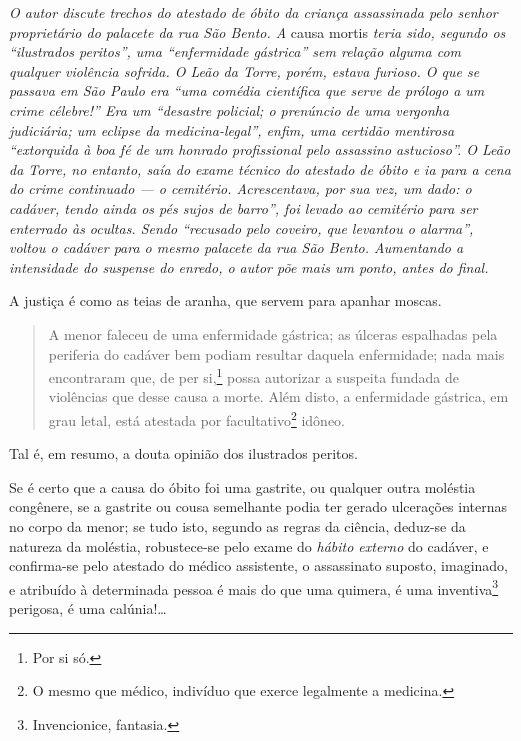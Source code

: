 {\begin{resumo}
\emph{O autor discute trechos do atestado de óbito da criança
assassinada pelo senhor proprietário do palacete da rua São Bento. A}
causa mortis \emph{teria sido, segundo os ``ilustrados peritos'', uma
``enfermidade gástrica'' sem relação alguma com qualquer violência
sofrida. O Leão da Torre, porém, estava furioso. O que se passava
em São Paulo era ``uma comédia científica que serve de prólogo a um crime
célebre!'' Era um ``desastre policial; o prenúncio de uma vergonha
judiciária; um eclipse da medicina-legal'', enfim, uma certidão mentirosa
``extorquida à boa fé de um honrado profissional pelo assassino
astucioso''. O Leão da Torre, no entanto, saía do exame técnico do
atestado de óbito e ia para a cena do crime continuado --- o cemitério.
Acrescentava, por sua vez, um dado: o cadáver, tendo ainda os pés sujos
de barro'', foi levado ao cemitério para ser enterrado às ocultas. Sendo
``recusado pelo coveiro, que levantou o alarma'', voltou o cadáver para o
mesmo palacete da rua São Bento. Aumentando a intensidade do suspense do
enredo, o autor põe mais um ponto, antes do final.}
\end{resumo}

\epigraph{A justiça é como as teias de aranha, que servem para apanhar
moscas.\footnotemark}{}

\begin{quote}
A menor faleceu de uma enfermidade gástrica; as úlceras espalhadas pela
periferia do cadáver bem podiam resultar daquela enfermidade; nada mais
encontraram que, de per si,\footnote{Por si só.} possa autorizar a
suspeita fundada de violências que desse causa a morte. Além disto, a
enfermidade gástrica, em grau letal, está atestada por
facultativo\footnote{O mesmo que médico, indivíduo que exerce
  legalmente a medicina.} idôneo.
\end{quote}  

Tal é, em resumo, a douta opinião dos ilustrados peritos.

Se é certo que a causa do óbito foi uma gastrite, ou qualquer outra
moléstia congênere, se a gastrite ou cousa semelhante podia ter gerado
ulcerações internas no corpo da menor; se tudo isto, segundo as regras
da ciência, deduz-se da natureza da moléstia, robustece-se pelo exame do
\emph{hábito externo} do cadáver, e confirma-se pelo atestado do médico
assistente, o assassinato suposto, imaginado, e atribuído à determinada
pessoa é mais do que uma quimera, é uma inventiva\footnote{
  Invencionice, fantasia.} perigosa, é uma calúnia!\ldots{}

}
